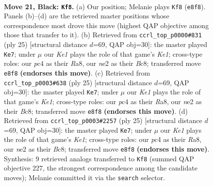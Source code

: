 \documentclass[11pt]{article}
\begin{document}
\clearpage

\begin{figure}[p]\centering
\begin{subfigure}{0.46\textwidth}\centering
\resizebox{\linewidth}{!}{%
\newchessgame
\chessboard[
  setfen={rn1rk1nb/p4p1p/P1p3p1/4p3/2P1P2P/5P2/4N1B1/R1B2RK1 b - - 0 21},
  showmover=false,
  pgfstyle=straightmove, color=movearrow, markmove={e8-f8}
]}
\caption{}
\end{subfigure}\hfill
\begin{subfigure}{0.46\textwidth}\centering
\resizebox{\linewidth}{!}{%
\newchessgame
\chessboard[
  setfen={r1b1k2r/pp1n1ppp/4p3/3pP3/3N1P2/8/PPP3PP/R3KB1R b KQkq - 0 13},
  showmover=false,
  pgfstyle=straightmove, color=movearrow, markmove={e8-e7}
]}
\caption{}
\end{subfigure}
\\[4pt]
\begin{subfigure}{0.46\textwidth}\centering
\resizebox{\linewidth}{!}{%
\newchessgame
\chessboard[
  setfen={r1b1k2r/pp1n1ppp/4p3/3pP3/3N1P2/8/PPP3PP/R3KB1R b KQkq - 0 13},
  showmover=false,
  pgfstyle=straightmove, color=movearrow, markmove={e8-e7}
]}
\caption{}
\end{subfigure}\hfill
\begin{subfigure}{0.46\textwidth}\centering
\resizebox{\linewidth}{!}{%
\newchessgame
\chessboard[
  setfen={r1b1k2r/pp1n1ppp/4p3/3pP3/3N1P2/8/PPP3PP/R3KB1R b KQkq - 0 13},
  showmover=false,
  pgfstyle=straightmove, color=movearrow, markmove={e8-e7}
]}
\caption{}
\end{subfigure}
\caption{\textbf{Move 21, Black: \texttt{Kf8}.} (a) Our position; Melanie plays \texttt{Kf8} (\texttt{e8f8}). Panels (b)--(d) are the retrieved master positions whose correspondence most drove this move (highest QAP objective among those that transfer to it). (b) Retrieved from \texttt{ccrl\_top\_p0000\#831} (ply 25) [structural distance $d$=69, QAP obj=30]: the master played \texttt{Ke7}; under $\mu$ our \emph{Ke1} plays the role of that game's \emph{Ke1}; cross-type roles: our \emph{p}c4 as their \emph{R}a8, our \emph{n}e2 as their \emph{B}c8; transferred move \texttt{e8f8} \textbf{(endorses this move)}. (c) Retrieved from \texttt{ccrl\_top\_p0003\#638} (ply 25) [structural distance $d$=69, QAP obj=30]: the master played \texttt{Ke7}; under $\mu$ our \emph{Ke1} plays the role of that game's \emph{Ke1}; cross-type roles: our \emph{p}c4 as their \emph{R}a8, our \emph{n}e2 as their \emph{B}c8; transferred move \texttt{e8f8} \textbf{(endorses this move)}. (d) Retrieved from \texttt{ccrl\_top\_p0003\#2257} (ply 25) [structural distance $d$=69, QAP obj=30]: the master played \texttt{Ke7}; under $\mu$ our \emph{Ke1} plays the role of that game's \emph{Ke1}; cross-type roles: our \emph{p}c4 as their \emph{R}a8, our \emph{n}e2 as their \emph{B}c8; transferred move \texttt{e8f8} \textbf{(endorses this move)}. Synthesis: 9 retrieved analogs transferred to \texttt{Kf8} (summed QAP objective 227, the strongest correspondence among the candidate moves); Melanie committed it via the \texttt{search} selector.}
\label{fig:thought-m41}
\end{figure}
\end{document}
